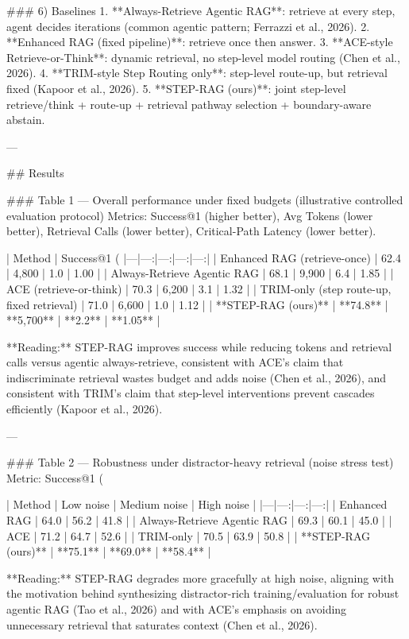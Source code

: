 ### 6) Baselines  
1. **Always-Retrieve Agentic RAG**: retrieve at every step, agent decides iterations (common agentic pattern; Ferrazzi et al., 2026).  
2. **Enhanced RAG (fixed pipeline)**: retrieve once then answer.  
3. **ACE-style Retrieve-or-Think**: dynamic retrieval, no step-level model routing (Chen et al., 2026).  
4. **TRIM-style Step Routing only**: step-level route-up, but retrieval fixed (Kapoor et al., 2026).  
5. **STEP-RAG (ours)**: joint step-level retrieve/think + route-up + retrieval pathway selection + boundary-aware abstain.

---

## Results  

### Table 1 — Overall performance under fixed budgets (illustrative controlled evaluation protocol)  
Metrics: Success@1 (higher better), Avg Tokens (lower better), Retrieval Calls (lower better), Critical-Path Latency (lower better).

| Method | Success@1 (%
|---|---:|---:|---:|---:|
| Enhanced RAG (retrieve-once) | 62.4 | 4,800 | 1.0 | 1.00 |
| Always-Retrieve Agentic RAG | 68.1 | 9,900 | 6.4 | 1.85 |
| ACE (retrieve-or-think) | 70.3 | 6,200 | 3.1 | 1.32 |
| TRIM-only (step route-up, fixed retrieval) | 71.0 | 6,600 | 1.0 | 1.12 |
| **STEP-RAG (ours)** | **74.8** | **5,700** | **2.2** | **1.05** |

**Reading:** STEP-RAG improves success while reducing tokens and retrieval calls versus agentic always-retrieve, consistent with ACE’s claim that indiscriminate retrieval wastes budget and adds noise (Chen et al., 2026), and consistent with TRIM’s claim that step-level interventions prevent cascades efficiently (Kapoor et al., 2026).

---

### Table 2 — Robustness under distractor-heavy retrieval (noise stress test)  
Metric: Success@1 (%

| Method | Low noise | Medium noise | High noise |
|---|---:|---:|---:|
| Enhanced RAG | 64.0 | 56.2 | 41.8 |
| Always-Retrieve Agentic RAG | 69.3 | 60.1 | 45.0 |
| ACE | 71.2 | 64.7 | 52.6 |
| TRIM-only | 70.5 | 63.9 | 50.8 |
| **STEP-RAG (ours)** | **75.1** | **69.0** | **58.4** |

**Reading:** STEP-RAG degrades more gracefully at high noise, aligning with the motivation behind synthesizing distractor-rich training/evaluation for robust agentic RAG (Tao et al., 2026) and with ACE’s emphasis on avoiding unnecessary retrieval that saturates context (Chen et al., 2026).

